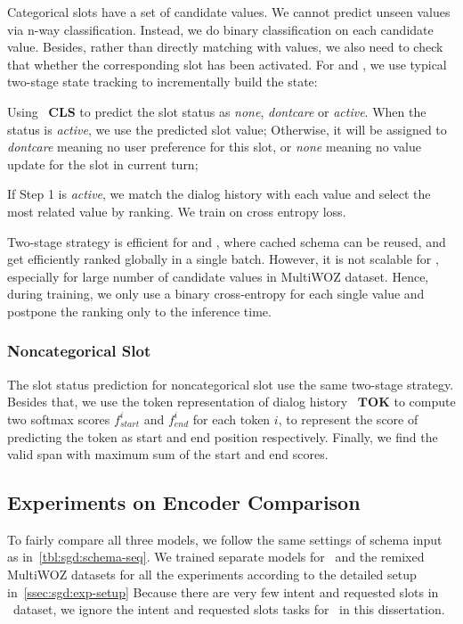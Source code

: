 Categorical slots have a set of candidate values. We cannot predict
unseen values via n-way classification. Instead, we do binary
classification on each candidate value. Besides, rather than directly
matching with values, we also need to check that whether the
corresponding slot has been activated. For \CE and \FE, we use typical
two-stage state tracking to incrementally build the state:
\begin{inparaenum}[{\bf Step} 1.]
\item Using ~$\mathbf{CLS}$ to predict the slot status as
  \textit{none}, \textit{dontcare} or \textit{active}. When the status is
  \textit{active}, we use the predicted slot value; Otherwise, it
  will be assigned to \textit{dontcare} meaning no user preference for this
  slot, or \textit{none} meaning no value update for the slot in current turn;
\item If Step 1 is \textit{active}, we match the dialog
  history with each value and select the most related value by ranking. We train on cross entropy loss.
\end{inparaenum}
Two-stage strategy is efficient for \DE and \FE, where cached schema
can be reused, and get efficiently ranked globally in a single
batch. However, it is not scalable for \CE, especially for large
number of candidate values in MultiWOZ dataset. Hence, during
training, we only use a binary cross-entropy for each single value and
postpone the ranking only to the inference time.

\subsubsection{Noncategorical Slot}
\label{sssec:sgd:noncategorical-slot}
The slot status prediction for
noncategorical slot use the same two-stage strategy. Besides that, we
use the token representation of dialog history ~$\mathbf{TOK}$ to
compute two softmax scores $f^{i}_{start}$ and $f^{i}_{end}$ for each
token $i$, to represent the score of predicting the token as start and
end position respectively. Finally, we find the valid span with
maximum sum of the start and end scores.

\subsection{Experiments on Encoder Comparison}
\label{ssec:encoder-results}
To fairly compare all three models, we follow the same settings of
schema input as in~\autoref{tbl:sgd:schema-seq}. We trained separate
models for \sgdst~and the remixed MultiWOZ datasets for all the
experiments according to the detailed setup
in~\autoref{ssec:sgd:exp-setup} Because there are very few intent and
requested slots in \multiwoz~dataset, we ignore the intent and
requested slots tasks for \multiwoz~in this dissertation.


